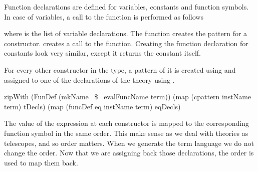 Function declarations are defined for variables, constants and function symbols. In case of variables, a call to the  function is performed as follows 
\begin{hscode}
\end{hscode}
\noindent where  is the list of variable declarations. The function  creates the pattern for a constructor.  creates a call to the  function. Creating the function declaration for constants look very similar, except it returns the constant itself. 
\begin{hscode}
\end{hscode}
For every other constructor in the type, a pattern of it is created using  and assigned to one of the declarations of the theory using . 
\begin{hscode}
zipWith (FunDef (mkName ~$\$$~  evalFuncName term)) 
        (map (cpattern instName term) tDecls)
        (map (funcDef eq instName term) eqDecls)
\end{hscode}
The value of the expression at each constructor is mapped to the corresponding function symbol in the same order. This make sense as we deal with theories as telescopes, and so order matters. When we generate the term language we do not change the order. Now that we are assigning back those declarations, the order is used to map them back. 


